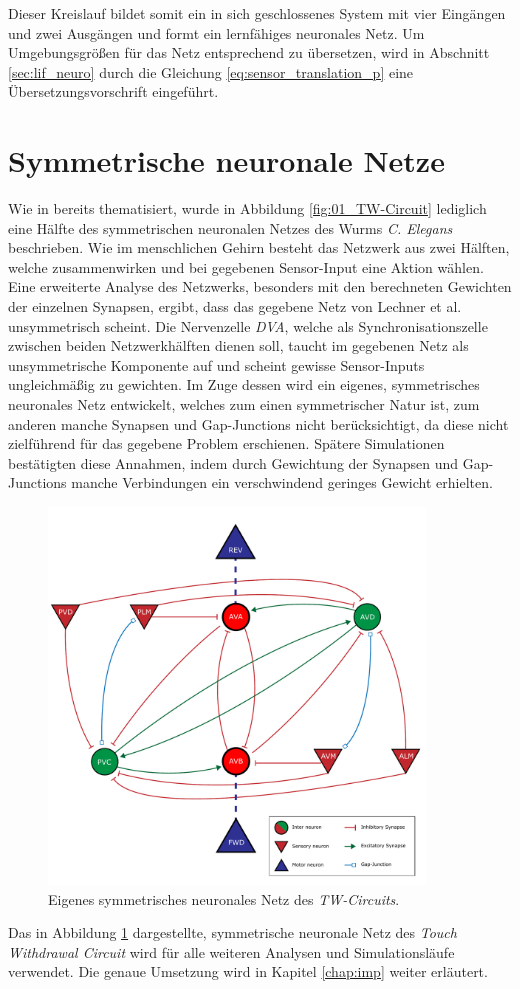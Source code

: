 	Dieser Kreislauf bildet somit ein in sich geschlossenes System mit vier Eingängen und zwei Ausgängen und formt ein lernfähiges neuronales Netz. Um Umgebungsgrößen für das Netz entsprechend zu übersetzen, wird in Abschnitt \ref{sec:lif_neuro} durch die Gleichung \eqref{eq:sensor_translation_p} eine Übersetzungsvorschrift eingeführt.
\section{Symmetrische neuronale Netze}
\label{sec:my_net}
	Wie in \cite{Wicks1996} bereits thematisiert, wurde in Abbildung \ref{fig:01_TW-Circuit} lediglich eine Hälfte des symmetrischen neuronalen Netzes des Wurms \textit{C. Elegans} beschrieben. Wie im menschlichen Gehirn besteht das Netzwerk aus zwei Hälften, welche zusammenwirken und bei gegebenen Sensor-Input eine Aktion wählen. Eine erweiterte Analyse des Netzwerks, besonders mit den berechneten Gewichten der einzelnen Synapsen, ergibt, dass das gegebene Netz von Lechner et al. unsymmetrisch scheint. Die Nervenzelle \textit{DVA}, welche als Synchronisationszelle zwischen beiden Netzwerkhälften dienen soll, taucht im gegebenen Netz als unsymmetrische Komponente auf und scheint gewisse Sensor-Inputs ungleichmäßig zu gewichten. Im Zuge dessen wird ein eigenes, symmetrisches neuronales Netz entwickelt, welches zum einen symmetrischer Natur ist, zum anderen manche Synapsen und Gap-Junctions nicht berücksichtigt, da diese nicht zielführend für das gegebene Problem erschienen. Spätere Simulationen bestätigten diese Annahmen, indem durch Gewichtung der Synapsen und Gap-Junctions manche Verbindungen ein verschwindend geringes Gewicht erhielten.
	\begin{figure}[H] %
		\centering
		\includegraphics[width=10cm]{figures/chap_neuron/Neural_Net_v3_plain.pdf}
		\caption{Eigenes symmetrisches neuronales Netz des \textit{TW-Circuits}.}
		\label{fig:nn_new}
	\end{figure}
	Das in Abbildung \ref{fig:nn_new} dargestellte, symmetrische neuronale Netz des \textit{Touch Withdrawal Circuit} wird für alle weiteren Analysen und Simulationsläufe verwendet. Die genaue Umsetzung wird in Kapitel \ref{chap:imp} weiter erläutert.
	


